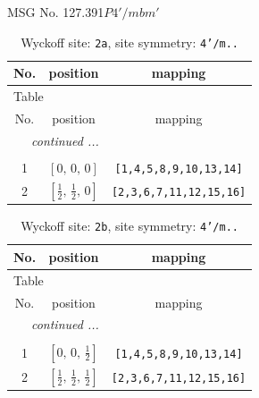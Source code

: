 \documentclass[fleqn,8pt]{jsarticle}
\begin{document}
\setcounter{MaxMatrixCols}{32}

\renewcommand{\tablename}{Table~}
\renewcommand{\figurename}{Figure~}
\begin{center}
\LARGE
MSG No. 127.391\quad$P4'/mbm'$
\end{center}
\renewcommand{\arraystretch}{1.2}
\begin{longtable}{ccc}
\caption{Wyckoff site: {\tt 2a}, site symmetry: {\tt 4'/m..}}
 \\
 \hline \hline
No. & position & mapping \\ \hline \endfirsthead

\multicolumn{2}{l}{\tablename\ \thetable{}} \\
 \hline \hline
No. & position & mapping \\ \hline \endhead

 \hline \hline
\multicolumn{2}{r}{\footnotesize\it continued ...} \\ \endfoot

 \hline \hline
\multicolumn{2}{r}{} \\ \endlastfoot

1 & $\left[ 0,\, 0,\, 0 \right]$ & {\tt [1,4,5,8,9,10,13,14]} \\ \hline
2 & $\left[ \frac{1}{2},\, \frac{1}{2},\, 0 \right]$ & {\tt [2,3,6,7,11,12,15,16]} \\
\end{longtable}
\renewcommand{\arraystretch}{1.2}
\begin{longtable}{ccc}
\caption{Wyckoff site: {\tt 2b}, site symmetry: {\tt 4'/m..}}
 \\
 \hline \hline
No. & position & mapping \\ \hline \endfirsthead

\multicolumn{2}{l}{\tablename\ \thetable{}} \\
 \hline \hline
No. & position & mapping \\ \hline \endhead

 \hline \hline
\multicolumn{2}{r}{\footnotesize\it continued ...} \\ \endfoot

 \hline \hline
\multicolumn{2}{r}{} \\ \endlastfoot

1 & $\left[ 0,\, 0,\, \frac{1}{2} \right]$ & {\tt [1,4,5,8,9,10,13,14]} \\ \hline
2 & $\left[ \frac{1}{2},\, \frac{1}{2},\, \frac{1}{2} \right]$ & {\tt [2,3,6,7,11,12,15,16]} \\
\end{longtable}
\end{document}
